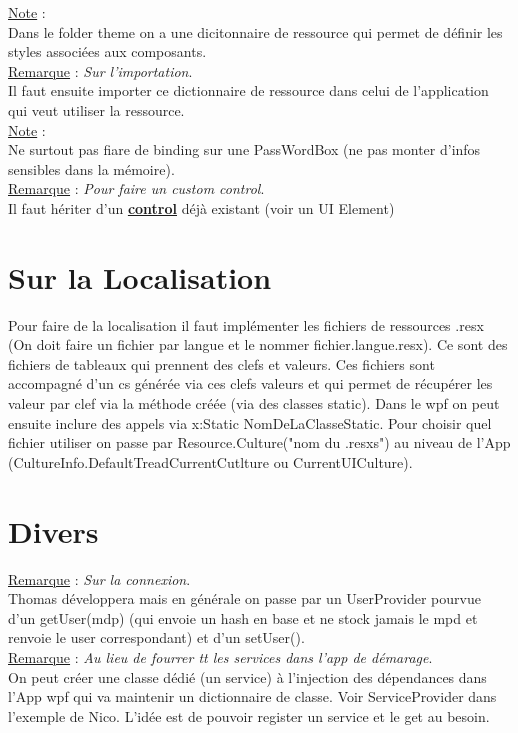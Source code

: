 \documentclass[a4paper,12pt,twoside]{article}
\newcommand{\urlcolor}{magenta}  %
\newcommand{\keycolor}{purple} %
\newcommand{\incode}[1]{{\footnotesize\ttfamily #1}} %
\newcommand{\rem}[2]{\noindent\underline{Remarque} : \textit{#1}.\\ \indent #2}
\newcommand{\note}[1]{\noindent\underline{Note} : \\ \indent #1}
\newcommand{\keyref}[2]{\hypersetup{urlcolor=\keycolor} \href{#1}{\textbf{#2}}\hypersetup{urlcolor=\urlcolor}}
\begin{document}
\note{Dans le folder theme on a une dicitonnaire de ressource qui permet de définir les styles associées aux composants.}\\

\rem{Sur l'importation}{Il faut ensuite importer ce dictionnaire de ressource dans celui de l'application qui veut utiliser la ressource.}\\

\note{Ne surtout pas fiare de binding sur une \incode{PassWordBox} (ne pas monter d'infos sensibles dans la mémoire).}\\

\rem{Pour faire un custom control}{Il faut hériter d'un \keyref{https://docs.microsoft.com/en-us/dotnet/api/system.windows.controls.control?view=windowsdesktop-6.0}{control} déjà existant (voir un UI Element)}\\

\section{Sur la Localisation}

Pour faire de la localisation il faut implémenter les fichiers de ressources \incode{.resx} (On doit faire un fichier par langue et le nommer fichier.langue.resx). Ce sont des fichiers de tableaux qui prennent des clefs et valeurs. Ces fichiers sont accompagné d'un cs générée via ces clefs valeurs et qui permet de récupérer les valeur par clef via la méthode créée (via des classes static). Dans le wpf on peut ensuite inclure des appels via  x:Static NomDeLaClasseStatic. Pour choisir quel fichier utiliser on passe par \incode{Resource.Culture("nom du .resxs")} au niveau de l'App (CultureInfo.DefaultTreadCurrentCutlture ou CurrentUICulture).

\section{Divers}

\rem{Sur la connexion}{Thomas développera mais en générale on passe par un UserProvider pourvue d'un getUser(mdp) (qui envoie un hash en base et ne stock jamais le mpd et renvoie le user correspondant) et d'un setUser().}\\

\rem{Au lieu de fourrer tt les services dans l'app de démarage}{On peut créer une classe dédié (un service) à l'injection des dépendances dans l'App wpf qui va maintenir un dictionnaire de classe. Voir ServiceProvider dans l'exemple de Nico. L'idée est de pouvoir register un service et le get au besoin.}\\
\end{document}
